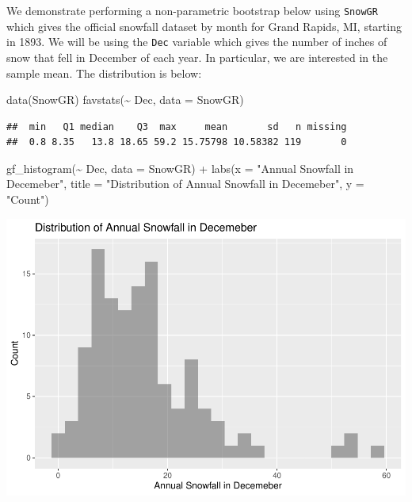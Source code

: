 \documentclass[12pt]{article}
\newenvironment{Shaded}{\begin{snugshade}}{\end{snugshade}}
\newcommand{\AttributeTok}[1]{\textcolor[rgb]{0.77,0.63,0.00}{#1}}
\newcommand{\FunctionTok}[1]{\textcolor[rgb]{0.00,0.00,0.00}{#1}}
\newcommand{\NormalTok}[1]{#1}
\newcommand{\SpecialCharTok}[1]{\textcolor[rgb]{0.00,0.00,0.00}{#1}}
\newcommand{\StringTok}[1]{\textcolor[rgb]{0.31,0.60,0.02}{#1}}
\begin{document}
We demonstrate performing a non-parametric bootstrap below using
\texttt{SnowGR} which gives the official snowfall dataset by month for
Grand Rapids, MI, starting in 1893. We will be using the \texttt{Dec}
variable which gives the number of inches of snow that fell in December
of each year. In particular, we are interested in the sample mean. The
distribution is below:

\begin{Shaded}
\begin{Highlighting}[]
\FunctionTok{data}\NormalTok{(SnowGR)}
\FunctionTok{favstats}\NormalTok{(}\SpecialCharTok{\textasciitilde{}}\NormalTok{ Dec, }\AttributeTok{data =}\NormalTok{ SnowGR)}
\end{Highlighting}
\end{Shaded}

\begin{verbatim}
##  min   Q1 median    Q3  max     mean       sd   n missing
##  0.8 8.35   13.8 18.65 59.2 15.75798 10.58382 119       0
\end{verbatim}

\begin{Shaded}
\begin{Highlighting}[]
\FunctionTok{gf\_histogram}\NormalTok{(}\SpecialCharTok{\textasciitilde{}}\NormalTok{ Dec, }\AttributeTok{data =}\NormalTok{ SnowGR) }\SpecialCharTok{+}
  \FunctionTok{labs}\NormalTok{(}\AttributeTok{x =} \StringTok{"Annual Snowfall in Decemeber"}\NormalTok{, }\AttributeTok{title =} \StringTok{"Distribution of Annual Snowfall in Decemeber"}\NormalTok{, }\AttributeTok{y =} \StringTok{"Count"}\NormalTok{)}
\end{Highlighting}
\end{Shaded}

\includegraphics{paper_files/figure-latex/unnamed-chunk-1-1.pdf}
\end{document}
